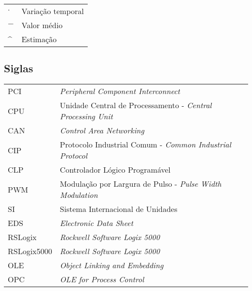 \begin{tabular}{p{}p{}}
$\cdot$  & Variação temporal \tabularnewline
$-$  & Valor médio \tabularnewline
\textasciicircum & Estimação \tabularnewline
\end{tabular}


\subsection*{Siglas}

\begin{tabular}{p{}p{}}
PCI  & \textit{Peripheral Component Interconnect}\tabularnewline
CPU & Unidade Central de Processamento - \textit{Central Processing Unit} \tabularnewline
CAN & \textit{Control Area Networking} \tabularnewline
CIP & Protocolo Industrial Comum - \textit{Common Industrial Protocol} \tabularnewline
CLP & Controlador Lógico Programável\tabularnewline
PWM &  Modulação por Largura de Pulso - \textit{Pulse Width Modulation}\tabularnewline
SI & Sistema Internacional de Unidades \tabularnewline
EDS & \textit{Electronic Data Sheet}
\tabularnewline
RSLogix & \textit{Rockwell Software Logix 5000}
\tabularnewline
RSLogix5000 & \textit{Rockwell Software Logix 5000}
\tabularnewline
OLE & \textit{Object Linking and Embedding}\tabularnewline
OPC & \textit{OLE for Process Control}\tabularnewline
\end{tabular}
